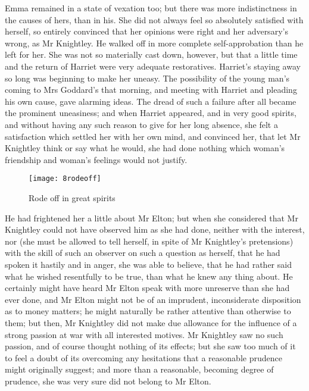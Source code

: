 Emma remained in a state of vexation too; but there was more indistinctness in the causes of hers, than in his. She did not always feel so absolutely satisfied with herself, so entirely convinced that her opinions were right and her adversary's wrong, as Mr Knightley. He walked off in more complete self-approbation than he left for her. She was not so materially cast down, however, but that a little time and the return of Harriet were very adequate restoratives. Harriet's staying away so long was beginning to make her uneasy. The possibility of the young man's coming to Mrs Goddard's that morning, and meeting with Harriet and pleading his own cause, gave alarming ideas. The dread of such a failure after all became the prominent uneasiness; and when Harriet appeared, and in very good spirits, and without having any such reason to give for her long absence, she felt a satisfaction which settled her with her own mind, and convinced her, that let Mr Knightley think or say what he would, she had done nothing which woman's friendship and woman's feelings would not justify.

\begin{figure}[tbph]
\centering
\texttt{[image: 8rodeoff]}
\caption{Rode off in great spirits}
\end{figure}

He had frightened her a little about Mr Elton; but when she considered that Mr Knightley could not have observed him as she had done, neither with the interest, nor (she must be allowed to tell herself, in spite of Mr Knightley's pretensions) with the skill of such an observer on such a question as herself, that he had spoken it hastily and in anger, she was able to believe, that he had rather said what he wished resentfully to be true, than what he knew any thing about. He certainly might have heard Mr Elton speak with more unreserve than she had ever done, and Mr Elton might not be of an imprudent, inconsiderate disposition as to money matters; he might naturally be rather attentive than otherwise to them; but then, Mr Knightley did not make due allowance for the influence of a strong passion at war with all interested motives. Mr Knightley saw no such passion, and of course thought nothing of its effects; but she saw too much of it to feel a doubt of its overcoming any hesitations that a reasonable prudence might originally suggest; and more than a reasonable, becoming degree of prudence, she was very sure did not belong to Mr Elton.

